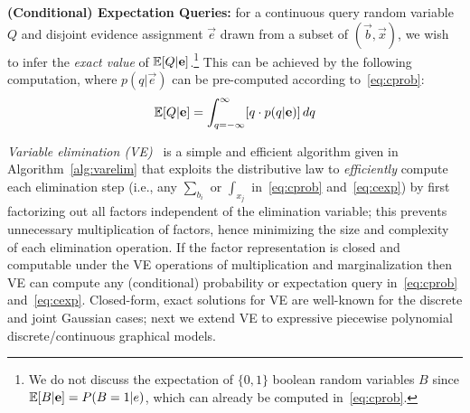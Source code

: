 \documentclass[letterpaper]{article}
\renewcommand{\-}{\text{-}}
\begin{document}
{%
{\bf (Conditional) Expectation Queries:} for a continuous
query random variable
$Q$ and disjoint evidence assignment $\vec{e}$ drawn from 
a subset of $(\vec{b},\vec{x})$, we wish to infer 
the \emph{exact value} of $\mathbb{E}[Q|\mathbf{e}]$.\footnote{We do not 
discuss the expectation of $\{0,1\}$ boolean
random variables $B$ since $\mathbb{E}[B|\mathbf{e}] = P(B=1|e)$, which can 
already be computed in~\eqref{eq:cprob}.} 
This can be achieved by the following
computation, where $p(q|\vec{e})$ can be pre-computed according to~\eqref{eq:cprob}:
\vspace{-0.5mm}
{\footnotesize 
\begin{equation} 
\E[Q|\vec{e}] = 
\int_{q=-\infty}^{\infty} [q \cdot p(q|\vec{e})] \, dq \label{eq:cexp}
\vspace{-0.5mm}
\end{equation}
}

\emph{Variable elimination (VE)}~\cite{varelim} is a simple and
efficient algorithm given in Algorithm~\ref{alg:varelim} that exploits
the distributive law to \emph{efficiently} compute each elimination
step (i.e., any $\sum_{b_{i}}$ or $\int_{x_{j}}$ in~\eqref{eq:cprob}
and~\eqref{eq:cexp}) by first factorizing out all factors independent
of the elimination variable; this prevents unnecessary multiplication
of factors, hence minimizing the size and complexity of each
elimination operation.  If the factor representation is closed and
computable under the VE operations of multiplication and
marginalization then VE can compute any (conditional) probability or
expectation query in~\eqref{eq:cprob} and~\eqref{eq:cexp}.  
Closed-form, exact solutions for VE are well-known for the discrete
and joint Gaussian cases; next we extend VE to expressive
piecewise polynomial discrete/continuous graphical models.


\incmargin{1.5em}
\linesnumbered
\begin{algorithm}[hb!]
\dontprintsemicolon


\end{algorithm}}
\end{document}
